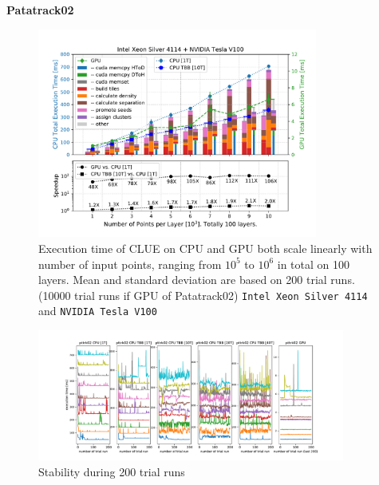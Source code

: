 
\newpage

\textbf{Patatrack02}

\begin{figure}[ht!]
    \centering
    \includegraphics[width=0.82\textwidth]{chapters/HGCal/figures/clue/private/Figure5_patatrack02_1.pdf}
    \caption{ Execution time of CLUE on CPU and GPU both scale linearly with number of input points, ranging from $10^5$ to $10^6$ in total on 100 layers.  Mean and standard deviation are based on 200 trial runs. (10000 trial runs if GPU of Patatrack02) \texttt{Intel Xeon Silver 4114} and \texttt{NVIDIA Tesla V100}}
\end{figure}
\begin{figure}[ht!]
    \centering
    \includegraphics[trim=3cm 0cm 3cm 0cm, clip,width=0.9\textwidth]{chapters/HGCal/figures/clue/private/addition_pttrk02.pdf}
    \caption{Stability during 200 trial runs}
\end{figure}


\newpage

